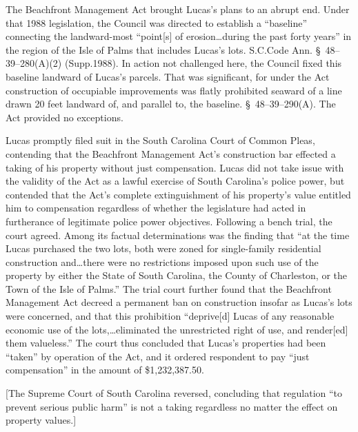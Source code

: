 The Beachfront Management Act brought Lucas's plans to an abrupt end. Under that
1988 legislation, the Council was directed to establish a ``baseline''
connecting the landward-most ``point[s] of erosion\ldots during the past forty
years'' in the region of the Isle of Palms that includes Lucas's lots. S.C.Code
Ann. \S~48--39--280(A)(2) (Supp.1988). In action not challenged here, the
Council fixed this baseline landward of Lucas's parcels. That was significant,
for under the Act construction of occupiable improvements was flatly prohibited
seaward of a line drawn 20 feet landward of, and parallel to, the baseline.
\S~48--39--290(A). The Act provided no exceptions.



Lucas promptly filed suit in the South Carolina Court of Common Pleas,
contending that the Beachfront Management Act's construction bar effected a
taking of his property without just compensation. Lucas did not take issue with
the validity of the Act as a lawful exercise of South Carolina's police power,
but contended that the Act's complete extinguishment of his property's value
entitled him to compensation regardless of whether the legislature had acted in
furtherance of legitimate police power objectives. Following a bench trial, the
court agreed. Among its factual determinations was the finding that ``at the
time Lucas purchased the two lots, both were zoned for single-family residential
construction and\ldots there were no restrictions imposed upon such use of the
property by either the State of South Carolina, the County of Charleston, or the
Town of the Isle of Palms.'' The trial court further found that the Beachfront
Management Act decreed a permanent ban on construction insofar as Lucas's lots
were concerned, and that this prohibition ``deprive[d] Lucas of any reasonable
economic use of the lots,\ldots eliminated the unrestricted right of use, and
render[ed] them valueless.'' The court thus concluded that Lucas's properties
had been ``taken'' by operation of the Act, and it ordered respondent to pay
``just compensation'' in the amount of \$1,232,387.50. 

[The Supreme Court of South Carolina reversed, concluding that regulation ``to
prevent serious public harm'' is not a taking regardless no matter the effect on
property values.]





